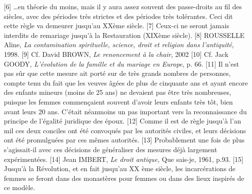 [6] …en théorie du moins, mais il y aura assez souvent des passe-droits au fil des siècles, avec des périodes très strictes et des périodes très tolérantes. Ceci dit cette règle va demeurer jusqu'au XXème siècle.
[7] Ceux-ci ne seront jamais interdits de remariage jusqu'à la Restauration (XIXème siècle).
[8] ROUSSELLE Aline, \emph{La contamination spirituelle, science, droit et religion dans l'antiquité}, 1998.
[9] Cf. David BROWN, \emph{Le renoncement à la chair}, 2002
[10] Cf. Jack GOODY, \emph{L'évolution de la famille et du mariage en Europe}, p. 66.
[11] Il n'est pas sûr que cette mesure ait porté sur de très grands nombres de personnes, compte tenu du fait que les veuves âgées de plus de cinquante ans et ayant encore des enfants mineurs (moins de 25 ans) ne devaient pas être très nombreuses, puisque les femmes commençaient souvent d'avoir leurs enfants très tôt, bien avant leurs 20 ans. C'était néanmoins un pas important vers la reconnaissance du principe de l'égalité juridique des époux.
[12] Comme il est de règle jusqu'à l'an mil ces deux conciles ont été convoqués par les autorités civiles, et leurs décisions ont été promulguées par ces mêmes autorités.
[13] Probablement une fois de plus s'agissait-il avec ces décisions de généraliser des mesures déjà largement expérimentées.
[14] Jean IMBERT, \emph{Le droit antique,} Que sais-je, 1961, p.93.
[15] Jusqu'à la Révolution, et en fait jusqu'au XX ème siècle, les incarcérations de femmes se feront dans des monastères pour femmes ou dans des lieux inspirés de ce modèle.